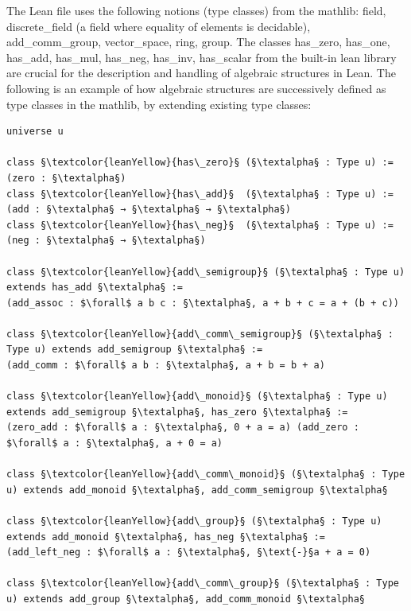 \documentclass[11pt]{article}
\begin{document}
The Lean file uses the following notions (type classes) from the mathlib: {\lean field}, {\lean discrete\_field} (a field where equality of elements is decidable), {\lean add\_comm\_group}, {\lean vector\_space}, {\lean ring}, {\lean group}.
The classes {\lean has\_zero}, {\lean has\_one}, {\lean has\_add}, {\lean has\_mul}, {\lean has\_neg}, {\lean has\_inv}, {\lean has\_scalar} from the built-in lean library are crucial for the description and handling of algebraic structures in Lean.
The following is an example of how algebraic structures are successively defined as type classes in the mathlib, by extending existing type classes:
\begin{lstlisting}
universe u

class §\textcolor{leanYellow}{has\_zero}§ (§\textalpha§ : Type u) := (zero : §\textalpha§)
class §\textcolor{leanYellow}{has\_add}§  (§\textalpha§ : Type u) := (add : §\textalpha§ → §\textalpha§ → §\textalpha§)
class §\textcolor{leanYellow}{has\_neg}§  (§\textalpha§ : Type u) := (neg : §\textalpha§ → §\textalpha§)

class §\textcolor{leanYellow}{add\_semigroup}§ (§\textalpha§ : Type u) extends has_add §\textalpha§ :=
(add_assoc : $\forall$ a b c : §\textalpha§, a + b + c = a + (b + c))

class §\textcolor{leanYellow}{add\_comm\_semigroup}§ (§\textalpha§ : Type u) extends add_semigroup §\textalpha§ :=
(add_comm : $\forall$ a b : §\textalpha§, a + b = b + a)

class §\textcolor{leanYellow}{add\_monoid}§ (§\textalpha§ : Type u) extends add_semigroup §\textalpha§, has_zero §\textalpha§ :=
(zero_add : $\forall$ a : §\textalpha§, 0 + a = a) (add_zero : $\forall$ a : §\textalpha§, a + 0 = a)

class §\textcolor{leanYellow}{add\_comm\_monoid}§ (§\textalpha§ : Type u) extends add_monoid §\textalpha§, add_comm_semigroup §\textalpha§

class §\textcolor{leanYellow}{add\_group}§ (§\textalpha§ : Type u) extends add_monoid §\textalpha§, has_neg §\textalpha§ :=
(add_left_neg : $\forall$ a : §\textalpha§, §\text{-}§a + a = 0)

class §\textcolor{leanYellow}{add\_comm\_group}§ (§\textalpha§ : Type u) extends add_group §\textalpha§, add_comm_monoid §\textalpha§
\end{lstlisting}
\end{document}
